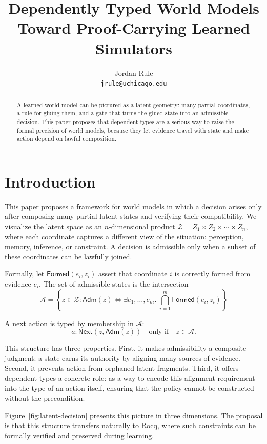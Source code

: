 \documentclass[12pt, a4paper]{article}
\title{\textbf{Dependently Typed World Models}\\[0.4em]
  \large Toward Proof-Carrying Learned Simulators}
\author{Jordan Rule\\[0.2em]
  \small \texttt{jrule@uchicago.edu}}
\begin{document}
\maketitle

\begin{abstract}
A learned world model can be pictured as a latent geometry: many partial
coordinates, a rule for gluing them, and a gate that turns the glued state into
an admissible decision. This paper proposes that dependent types are a serious
way to raise the formal precision of world models, because they let evidence
travel with state and make action depend on lawful composition.
\end{abstract}

\section{Introduction}

This paper proposes a framework for world models in which a decision arises only
after composing many partial latent states and verifying their compatibility. We
visualize the latent space as an $n$-dimensional product $\mathcal{Z} = Z_1
\times Z_2 \times \cdots \times Z_n$, where each coordinate captures a different
view of the situation: perception, memory, inference, or constraint. A decision
is admissible only when a subset of these coordinates can be lawfully joined.

Formally, let $\mathsf{Formed}(e_i, z_i)$ assert that coordinate $i$ is correctly
formed from evidence $e_i$. The set of admissible states is the intersection
\[
  \mathcal{A} = \left\{ z \in \mathcal{Z} : \mathsf{Adm}(z) \Leftrightarrow
  \exists e_1, \ldots, e_m. \; \bigcap_{i=1}^{m} \mathsf{Formed}(e_i, z_i)
  \right\}
\]

A next action is typed by membership in $\mathcal{A}$:
\[
  a : \mathsf{Next}(z, \mathsf{Adm}(z))
  \quad \text{only if} \quad
  z \in \mathcal{A}.
\]

This structure has three properties. First, it makes admissibility a composite
judgment: a state earns its authority by aligning many sources of evidence.
Second, it prevents action from orphaned latent fragments. Third, it offers
dependent types a concrete role: as a way to encode this alignment requirement
into the type of an action itself, ensuring that the policy cannot be
constructed without the precondition.

Figure~\ref{fig:latent-decision} presents this picture in three dimensions. The
proposal is that this structure transfers naturally to Rocq, where such
constraints can be formally verified and preserved during learning.
\end{document}
